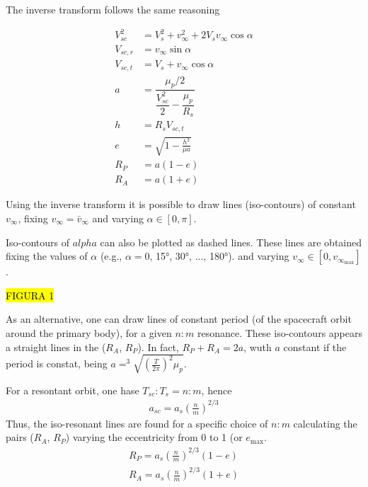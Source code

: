 \documentclass{article}
\newcommand{\vinf}{v_\infty}
\begin{document}
The inverse transform follows the same reasoning

\begin{align}
    V_{sc}^2 &= V_s^2 + \vinf^2 + 2 V_s \vinf \cos\alpha\\
     V_{sc,r} &= \vinf \sin\alpha\\
     V_{sc,t} &= V_s + \vinf \cos\alpha\\
     a &= \dfrac{\mu_p/2}{\dfrac{V_{sc}^2}{2}-\dfrac{\mu_p}{R_s}}\\
     h &= R_s V_{sc,t} \\
     e &= \sqrt{1-\frac{h^2}{\mu a}}\\
     R_P &= a(1-e)\\
    R_A &= a(1+e)
\end{align}



Using the inverse transform it is possible to draw lines (iso-contours) of constant $\vinf$,
fixing $\vinf=\bar{v}_\infty$ and
varying $\alpha \in [0, \pi]$.

Iso-contours of $alpha$ can also be plotted as dashed lines. These lines are obtained fixing the values of $\alpha$ (e.g., $\alpha=0$, 15°, 30°, ..., 180°). and varying $\vinf \in [0, v_{\infty_\text{max}}]$.


\hl{FIGURA 1}
 

As an alternative, one can draw lines of constant period (of the spacecraft orbit around the primary body), for a given $n:m$ resonance.
These iso-contours appears a straight lines in the ($R_A$, $R_P$). 
In fact, $R_P+R_A = 2 a$, wuth $a$ constant if the period is constat, being $a = ^3\sqrt{\left(\frac{T}{2\pi}\right)^2\mu_p}$.

For a resontant orbit, one hase $T_{sc}:T_s = n:m$, hence
\begin{align}
    a_{sc} = a_s (\frac{n}{m})^{2/3}
\end{align}
Thus, the iso-resonant lines are found for a specific choice of $n:m$ calculating the pairs ($R_A$, $R_P$) varying the eccentricity from 0 to 1 (or $e_\text{max}$.
\begin{align}
    R_P = a_s (\frac{n}{m})^{2/3} \left(1-e\right)\\
    R_A = a_s (\frac{n}{m})^{2/3} \left(1+e\right)
\end{align}
\end{document}
